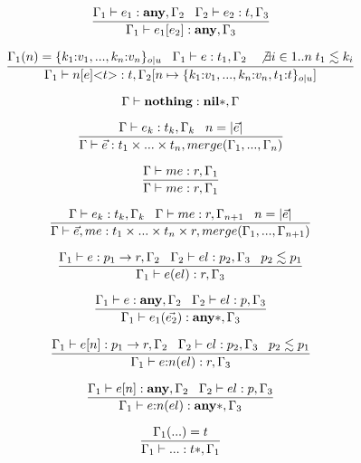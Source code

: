 \[
\dfrac{\Gamma_{1} \vdash e_{1}:\mathbf{any}, \Gamma_{2} \;\;\;
       \Gamma_{2} \vdash e_{2}:t, \Gamma_{3}}
      {\Gamma_{1} \vdash e_{1}[e_{2}]:\mathbf{any}, \Gamma_{3}}
\]

\[
\dfrac{\Gamma_{1}(n) = \{ k_{1}{:}v_{1}, ..., k_{n}{:}v_{n} \}_{o|u} \;\;\;
       \Gamma_{1} \vdash e:t_{1}, \Gamma_{2} \;\;\;
       \not \exists i \in 1..n \; t_{1} \lesssim k_{i}}
      {\Gamma_{1} \vdash n[e] {<}t{>}:t, \Gamma_{2}[n \mapsto \{ k_{1}{:}v_{1}, ..., k_{n}{:}v_{n}, t_{1}{:}t\}_{o|u}]}
\]

\[
\Gamma \vdash \mathbf{nothing}:\mathbf{nil}{*}, \Gamma
\]

\[
\dfrac{\Gamma \vdash e_{k}:t_{k}, \Gamma_{k} \;\;\;
       n = |\vec{e}|}
      {\Gamma \vdash \vec{e}:t_{1} \times ... \times t_{n}, merge(\Gamma_{1}, ..., \Gamma_{n})}
\]

\[
\dfrac{\Gamma \vdash me:r, \Gamma_{1}}
      {\Gamma \vdash me:r, \Gamma_{1}}
\]

\[
\dfrac{\Gamma \vdash e_{k}:t_{k}, \Gamma_{k} \;\;\;
       \Gamma \vdash me:r, \Gamma_{n + 1} \;\;\;
       n = |\vec{e}|}
      {\Gamma \vdash \vec{e}, me:t_{1} \times ... \times t_{n} \times r, merge(\Gamma_{1}, ..., \Gamma_{n+1})}
\]

\[
\dfrac{\Gamma_{1} \vdash e:p_{1} \rightarrow r, \Gamma_{2} \;\;\;
       \Gamma_{2} \vdash el:p_{2}, \Gamma_{3} \;\;\;
       p_{2} \lesssim p_{1}}
      {\Gamma_{1} \vdash e(el):r, \Gamma_{3}}
\]

\[
\dfrac{\Gamma_{1} \vdash e:\mathbf{any}, \Gamma_{2} \;\;\;
       \Gamma_{2} \vdash el:p, \Gamma_{3}}
      {\Gamma_{1} \vdash e_{1}(\vec{e_{2}}):\mathbf{any}{*}, \Gamma_{3}}
\]

\[
\dfrac{\Gamma_{1} \vdash e[n]:p_{1} \rightarrow r, \Gamma_{2} \;\;\;
       \Gamma_{2} \vdash el:p_{2}, \Gamma_{3} \;\;\;
       p_{2} \lesssim p_{1}}
      {\Gamma_{1} \vdash e{:}n(el):r, \Gamma_{3}}
\]

\[
\dfrac{\Gamma_{1} \vdash e[n]:\mathbf{any}, \Gamma_{2} \;\;\;
       \Gamma_{2} \vdash el:p, \Gamma_{3}}
      {\Gamma_{1} \vdash e{:}n(el):\mathbf{any}{*}, \Gamma_{3}}
\]

\[
\dfrac{\Gamma_{1}({...}) = t}
      {\Gamma_{1} \vdash {...}:t{*}, \Gamma_{1}}
\]


